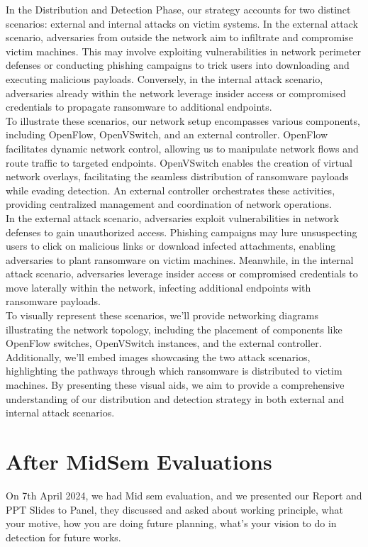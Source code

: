 \documentclass[12pt,twocolumn]{article}
\begin{document}
In the Distribution and Detection Phase, our strategy accounts for two distinct scenarios: external and internal attacks on victim systems. In the external attack scenario, adversaries from outside the network aim to infiltrate and compromise victim machines. This may involve exploiting vulnerabilities in network perimeter defenses or conducting phishing campaigns to trick users into downloading and executing malicious payloads. Conversely, in the internal attack scenario, adversaries already within the network leverage insider access or compromised credentials to propagate ransomware to additional endpoints.
\\
To illustrate these scenarios, our network setup encompasses various components, including OpenFlow, OpenVSwitch, and an external controller. OpenFlow facilitates dynamic network control, allowing us to manipulate network flows and route traffic to targeted endpoints. OpenVSwitch enables the creation of virtual network overlays, facilitating the seamless distribution of ransomware payloads while evading detection. An external controller orchestrates these activities, providing centralized management and coordination of network operations.
\\
In the external attack scenario, adversaries exploit vulnerabilities in network defenses to gain unauthorized access. Phishing campaigns may lure unsuspecting users to click on malicious links or download infected attachments, enabling adversaries to plant ransomware on victim machines. Meanwhile, in the internal attack scenario, adversaries leverage insider access or compromised credentials to move laterally within the network, infecting additional endpoints with ransomware payloads.
\\
To visually represent these scenarios, we'll provide networking diagrams illustrating the network topology, including the placement of components like OpenFlow switches, OpenVSwitch instances, and the external controller. Additionally, we'll embed images showcasing the two attack scenarios, highlighting the pathways through which ransomware is distributed to victim machines. By presenting these visual aids, we aim to provide a comprehensive understanding of our distribution and detection strategy in both external and internal attack scenarios.


\section{After MidSem Evaluations}
On 7th April 2024, we had Mid sem evaluation, and we presented our Report and PPT Slides to Panel, they discussed and asked about working principle, what your motive, how you are doing future planning, what's your vision to do in detection for future works.
\end{document}
